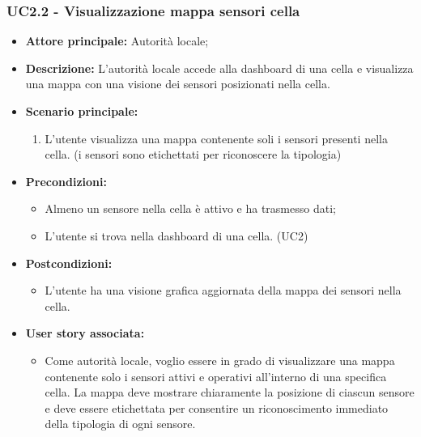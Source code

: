 \documentclass{article}
\begin{document}
\subsubsection{UC2.2 - Visualizzazione mappa sensori cella}
\begin{itemize}
    \item \textbf{Attore principale:} Autorità locale;
    \item \textbf{Descrizione:} L'autorità locale accede alla dashboard di una cella e visualizza una mappa con una visione dei sensori posizionati nella cella.
    \item \textbf{Scenario principale:}
          \begin{enumerate}
              \item L'utente visualizza una mappa contenente soli i sensori presenti nella cella. (i sensori sono etichettati per riconoscere la tipologia)
          \end{enumerate}
    \item \textbf{Precondizioni:}
          \begin{itemize}
              \item  Almeno un sensore nella cella è attivo e ha trasmesso dati;
              \item L'utente si trova nella dashboard di una cella. (UC2)
          \end{itemize}
    \item \textbf{Postcondizioni:}
          \begin{itemize}
              \item      L'utente ha una visione grafica aggiornata della mappa dei sensori nella cella.
          \end{itemize}
    \item \textbf{User story associata:}
          \begin{itemize}
              \item Come autorità locale, voglio essere in grado di visualizzare una mappa contenente solo i sensori attivi e operativi all'interno di una specifica cella. La mappa deve mostrare chiaramente la posizione di ciascun sensore e deve essere etichettata per consentire un riconoscimento immediato della tipologia di ogni sensore.
          \end{itemize}
\end{itemize}

\end{document}
